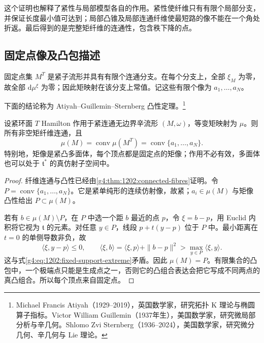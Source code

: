 这个证明也解释了紧性与局部模型各自的作用。紧性使纤维只有有限个局部分支，并保证长度最小值可达到；局部凸锥及局部连通纤维使最短路的像不能在一个角处折返。最后得到的是完整矩纤维的连通性，包含秩下降的点。

\subsection{固定点像及凸包描述}
\label{g4:subsec:1202:04}

固定点集 \(M^T\) 是紧子流形并具有有限个连通分支。在每个分支上，全部 \(\xi_M\) 为零，故全部 \(\mathrm d\mu^\xi\) 为零；因此矩映射在该分支上常值。记这些有限个像为 \(a_1,\ldots,a_N\)。

下面的结论称为 Atiyah–Guillemin–Sternberg 凸性定理。\footnote{Michael Francis Atiyah（1929--2019），英国数学家，研究拓扑 K 理论与椭圆算子指标。Victor William Guillemin（1937年生），美国数学家，研究微局部分析与辛几何。Shlomo Zvi Sternberg（1936--2024），美国数学家，研究微分几何、辛几何与 Lie 理论。}

\begin{theorem}\label{g4:thm:1202:convexity}
	设紧环面 \(T\) Hamilton 作用于紧连通无边界辛流形 \((M,\omega)\)，等变矩映射为 \(\mu\)。则所有非空矩纤维连通，且
	\begin{equation}\label{g4:eq:1202:fixed-convex-hull}
		\mu(M)=\operatorname{conv}\mu(M^T)
		=\operatorname{conv}\{a_1,\ldots,a_N\}.
	\end{equation}
	特别地，矩像是紧凸多面体，每个顶点都是固定点的矩像；作用不必有效，多面体也可以处于 \(\mathfrak t^*\) 的真仿射子空间中。
\end{theorem}
\begin{proof}
	纤维连通与凸性已经由\cref{g4:thm:1202:connected-fibres}证明。令 \(P=\operatorname{conv}\{a_1,\ldots,a_N\}\)。它是紧单纯形的连续仿射像，故紧；\(a_i\in\mu(M)\) 与矩像凸性给出 \(P\subset\mu(M)\)。

	若有 \(b\in\mu(M)\setminus P\)，在 \(P\) 中选一个距 \(b\) 最近的点 \(p\)，令 \(\xi=b-p\)，用 Euclid 内积将它视为 \(\mathfrak t\) 的元素。对任意 \(y\in P\)，线段 \(p+t(y-p)\) 位于 \(P\) 中。最小距离在 \(t=0\) 的单侧导数非负，故
	\[
		\langle\xi,y-p\rangle\leq0,
		\qquad
		\langle\xi,b\rangle
		=\langle\xi,p\rangle+\|b-p\|^2
		>\max_{y\in P}\langle\xi,y\rangle.
	\]
	这与式\eqref{g4:eq:1202:fixed-support-extreme}矛盾。因此 \(\mu(M)=P\)。有限集合的凸包中，一个极端点只能是生成点之一，否则它的凸组合表达会把它写成不同两点的真凸组合。所以每个顶点来自固定点。\cite[第5.7节，定理5.21，第158页]{Cannas2006Symplectic}
\end{proof}

